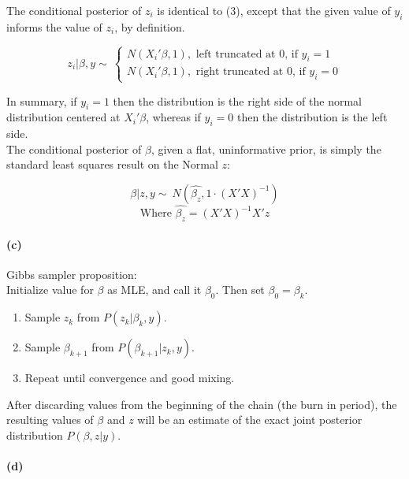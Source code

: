 \documentclass[12pt,letterpaper]{article}
\begin{document}
The conditional posterior of $z_i$ is identical to (3), except that the given value of $y_i$ informs the value of $z_i$, by definition.

\begin{displaymath}
z_i|\beta,y \sim\ \left\{
  \begin{array}{lr}
  N(X_i'\beta, 1), \text{ left truncated at $0$, if } y_i=1\\
    N(X_i'\beta, 1), \text{ right truncated at $0$, if } y_i=0
  \end{array}
  \right.
  \end{displaymath}
  
  In summary, if $y_i=1$ then the distribution is the right side of the normal distribution centered at $X_i'\beta$, whereas if $y_i=0$ then the distribution is the left side.\\

The conditional posterior of $\beta$, given a flat, uninformative prior, is simply the standard least squares result on the Normal $z$:

\begin{equation}
\beta|z,y \sim\ N(\hat{\beta_z}, 1 \cdot (X'X)^{-1})
\end{equation}
\begin{equation}
\text{Where } \hat{\beta_z} = (X'X)^{-1}X'z
\end{equation}



\paragraph{(c)}

Gibbs sampler proposition:\\
Initialize value for $\beta$ as MLE, and call it $\beta_0$. Then set $\beta_0=\beta_k$.
\begin{enumerate}
\item Sample $z_k$ from $P(z_k|\beta_k,y)$.
\item Sample $\beta_{k+1}$ from $P(\beta_{k+1}|z_k,y)$.
\item Repeat until convergence and good mixing.
\end{enumerate}

After discarding values from the beginning of the chain (the burn in period), the resulting values of $\beta$ and $z$ will be an estimate of the exact joint posterior distribution $P(\beta, z | y)$.

\paragraph{(d)}
\end{document}
